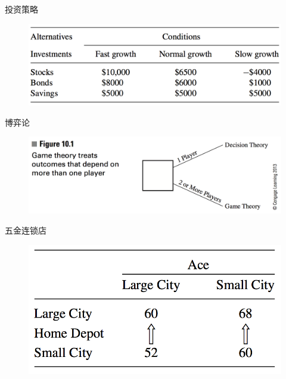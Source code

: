\documentclass[mathserif, table]{beamer}
\begin{document}
\begin{frame}{投资策略}
  
  \begin{figure}
    \includegraphics[width=0.8\textwidth{}]{invest.png}
  \end{figure}
  
\end{frame}

\begin{frame}{博弈论}
  
  \begin{figure}
    \includegraphics[width=0.8\textwidth{}]{10_1.png}
  \end{figure}

\end{frame}

\begin{frame}{五金连锁店}
  
  \begin{figure}
    \includegraphics[width=0.8\textwidth{}]{homedepot.png}
  \end{figure}

\end{frame}
\end{document}
